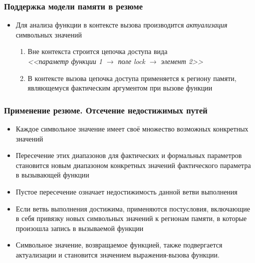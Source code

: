 \documentclass[14pt]{beamer}
\begin{document}
\begin{frame}
\frametitle{Поддержка модели памяти в резюме}
\begin{itemize}
  \item Для анализа функции в контексте вызова производится \textit{актуализация} символьных значений
  \begin{enumerate}
    \item Вне контекста строится цепочка доступа вида \\ \textit{<<параметр функции 1 $\rightarrow$ поле lock $\rightarrow$ элемент 2>>}
    \item В контексте вызова цепочка доступа применяется к региону памяти, являющемуся фактическим аргументом при вызове функции
  \end{enumerate}
\end{itemize}
\end{frame}

\begin{frame}[allowframebreaks]
\frametitle{Применение резюме. Отсечение недостижимых путей}
\begin{itemize}
  \item Каждое символьное значение имеет своё множество возможных конкретных значений
  \item Пересечение этих диапазонов для фактических и формальных параметров становится новым диапазоном конкретных значений фактического параметра в вызывающей функции
  \item Пустое пересечение означает недостижимость данной ветви выполнения
  \item Если ветвь выполнения достижима, применяются постусловия, включающие в себя привязку новых символьных значений к регионам памяти, в которые произошла запись в вызываемой функции
  \item Символьное значение, возвращаемое функцией, также подвергается актуализации и становится значением выражения-вызова функции.
\end{itemize}
\end{frame}
\end{document}
